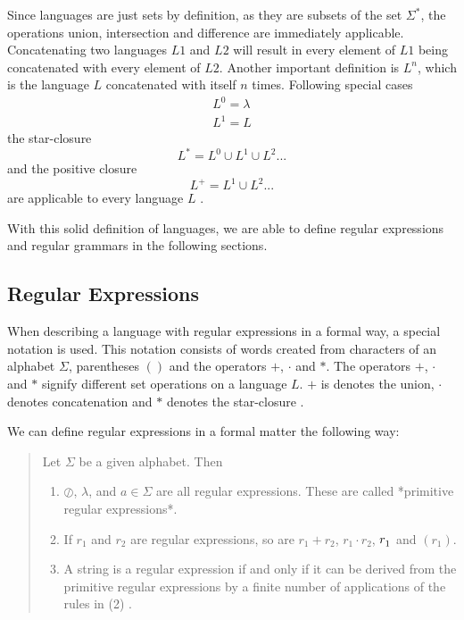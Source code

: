 \documentclass[runningheads]{llncs}
\begin{document}
Since languages are just sets by definition, as they are subsets of the set $\Sigma^{*}$, the operations union, intersection and difference are immediately applicable. Concatenating two languages $L1$ and $L2$ will result in every element of $L1$ being concatenated with every element of $L2$. Another important definition is $L^n$, which is the language $L$ concatenated with itself $n$ times. Following special cases
\begin{align}
L^0 = {\lambda}\\
L^1 = L
\end{align}
the star-closure
\begin{equation}
L^* = L^0 \cup L^1 \cup L^2 ...
\end{equation}
and the positive closure
\begin{equation}
L^+ = L^1 \cup L^2 ...
\end{equation}
are applicable to every language $L$ \cite[19-20]{fla-2017}.

With this solid definition of languages, we are able to define regular expressions and regular grammars in the following sections.


\subsection{Regular Expressions}
When describing a language with regular expressions in a formal way, a special notation is used. This notation consists of words created from characters of an alphabet $\Sigma$, parentheses $()$ and the operators $+$, $\cdot$ and $*$. The operators $+$, $\cdot$ and $*$ signify different set operations on a language $L$. $+$ is denotes the union, $\cdot$ denotes concatenation and $*$ denotes the star-closure \cite[74]{fla-2017}.

We can define regular expressions in a formal matter the following way:
\begin{quote}
    Let $\Sigma$ be a given alphabet. Then
    \begin{enumerate}
        \item $\oslash$, $\lambda$, and $a \in \Sigma$ are all regular expressions. These are called *primitive regular expressions*.
        \item If $r_1$ and $r_2$ are regular expressions, so are $r_1 + r_2$, $r_1 \cdot r_2$, $r_1^{\*}$ and $(r_1)$.
        \item A string is a regular expression if and only if it can be derived from the primitive regular expressions by a finite number of applications of the rules in (2) \cite[74]{fla-2017}.
    \end{enumerate}
\end{quote}
\end{document}
